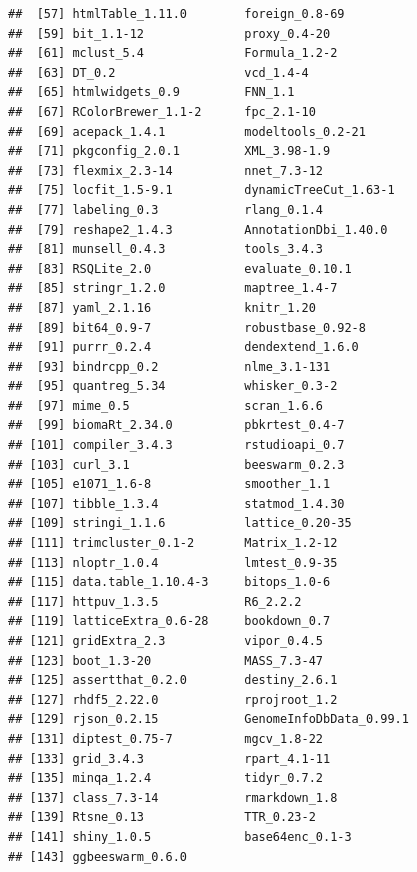 \documentclass[]{book}
\theoremstyle{definition}
\theoremstyle{definition}
\theoremstyle{definition}
\theoremstyle{remark}
\begin{document}
\begin{verbatim}
##  [57] htmlTable_1.11.0        foreign_0.8-69         
##  [59] bit_1.1-12              proxy_0.4-20           
##  [61] mclust_5.4              Formula_1.2-2          
##  [63] DT_0.2                  vcd_1.4-4              
##  [65] htmlwidgets_0.9         FNN_1.1                
##  [67] RColorBrewer_1.1-2      fpc_2.1-10             
##  [69] acepack_1.4.1           modeltools_0.2-21      
##  [71] pkgconfig_2.0.1         XML_3.98-1.9           
##  [73] flexmix_2.3-14          nnet_7.3-12            
##  [75] locfit_1.5-9.1          dynamicTreeCut_1.63-1  
##  [77] labeling_0.3            rlang_0.1.4            
##  [79] reshape2_1.4.3          AnnotationDbi_1.40.0   
##  [81] munsell_0.4.3           tools_3.4.3            
##  [83] RSQLite_2.0             evaluate_0.10.1        
##  [85] stringr_1.2.0           maptree_1.4-7          
##  [87] yaml_2.1.16             knitr_1.20             
##  [89] bit64_0.9-7             robustbase_0.92-8      
##  [91] purrr_0.2.4             dendextend_1.6.0       
##  [93] bindrcpp_0.2            nlme_3.1-131           
##  [95] quantreg_5.34           whisker_0.3-2          
##  [97] mime_0.5                scran_1.6.6            
##  [99] biomaRt_2.34.0          pbkrtest_0.4-7         
## [101] compiler_3.4.3          rstudioapi_0.7         
## [103] curl_3.1                beeswarm_0.2.3         
## [105] e1071_1.6-8             smoother_1.1           
## [107] tibble_1.3.4            statmod_1.4.30         
## [109] stringi_1.1.6           lattice_0.20-35        
## [111] trimcluster_0.1-2       Matrix_1.2-12          
## [113] nloptr_1.0.4            lmtest_0.9-35          
## [115] data.table_1.10.4-3     bitops_1.0-6           
## [117] httpuv_1.3.5            R6_2.2.2               
## [119] latticeExtra_0.6-28     bookdown_0.7           
## [121] gridExtra_2.3           vipor_0.4.5            
## [123] boot_1.3-20             MASS_7.3-47            
## [125] assertthat_0.2.0        destiny_2.6.1          
## [127] rhdf5_2.22.0            rprojroot_1.2          
## [129] rjson_0.2.15            GenomeInfoDbData_0.99.1
## [131] diptest_0.75-7          mgcv_1.8-22            
## [133] grid_3.4.3              rpart_4.1-11           
## [135] minqa_1.2.4             tidyr_0.7.2            
## [137] class_7.3-14            rmarkdown_1.8          
## [139] Rtsne_0.13              TTR_0.23-2             
## [141] shiny_1.0.5             base64enc_0.1-3        
## [143] ggbeeswarm_0.6.0
\end{verbatim}


\end{document}
